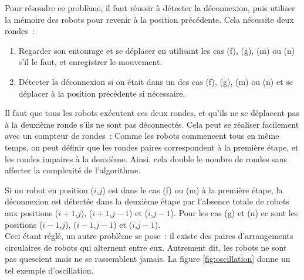 


Pour résoudre ce problème, il faut réussir à détecter la déconnexion, puis
utiliser la mémoire des robots pour revenir à la position précédente. Cela
nécessite deux rondes~:
\begin{enumerate}[1]
  \item Regarder son entourage et se déplacer en utilisant les cas (f), (g),
  (m) ou (n) s'il le faut, et enregistrer le mouvement.
  \item Détecter la déconnexion si on était dans un des cas (f), (g), (m) ou
  (n) et se déplacer à la position précédente si nécessaire.
\end{enumerate}
Il faut que tous les robots exécutent ces deux rondes, et qu'ils ne se
déplacent pas à la deuxième ronde s'ils ne sont pas déconnectés. Cela peut se
réaliser facilement avec un compteur de rondes~: Comme les robots commencent
tous en même temps, on peut définir que les rondes paires correspondent à la
première étape, et les rondes impaires à la deuxième. Ainsi, cela double le
nombre de rondes sans affecter la complexité de l'algorithme.

Si un robot en position ($i$,$j$) est dans le cas (f) ou (m) à la première
étape, la déconnexion est détectée dans la deuxième étape par l'absence totale
de robots aux positions ($i+1$,$j$), ($i+1$,$j-1$) et ($i$,$j-1$). Pour les cas
(g) et (n) ce sont les positions ($i-1$,$j$), ($i-1$,$j-1$) et ($i$,$j-1$). \\

Ceci étant réglé, un autre problème se pose~: il existe des paires
d'arrangements circulaires de robots qui alternent entre eux. Autrement dit,
les robots ne sont pas quescient mais ne se rassemblent jamais. La figure
\ref{fig:oscillation} donne un tel exemple d'oscillation.



